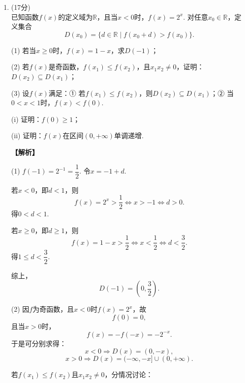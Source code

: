 \documentclass[12pt,a4paper]{article}
\begin{document}
\begin{enumerate}[leftmargin=*,label=\arabic*.,resume,itemsep=1.2ex]
		(ii) 仍设$u_P,u_Q$为上述方程两根，记
		\[
		S=u_P+u_Q=\frac6{3+4t^2}.
		\]
		向量
		\[
		\overrightarrow{QP}=(u_P-u_Q,t(u_P-u_Q)),
		\]
		\[
		\overrightarrow{QR}=(-P)-Q=(2-S,-tS).
		\]
		于是
		\[
		|\overrightarrow{QP}\times\overrightarrow{QR}|=2t(u_P-u_Q),
		\]
		\[
		\overrightarrow{QP}\cdot\overrightarrow{QR}
		=(u_P-u_Q)\left[2-S(1+t^2)\right].
		\]
		因此
		\[
		\tan\angle PQR
		=\frac{2t}{2-S(1+t^2)}.
		\]
		代入$S=\dfrac6{3+4t^2}$，化简得
		\[
		\tan\angle PQR
		=\frac{3+4t^2}{t}
		=4t+\frac3t.
		\]
		由均值不等式，
		\[
		4t+\frac3t\ge2\sqrt{12}=4\sqrt3,
		\]
		当且仅当$4t=\dfrac3t$，即$t=\dfrac{\sqrt3}{2}$时取等号.
		
		所以
		\[
		\boxed{\tan\angle PQR_{\min}=4\sqrt3}.
		\]
		
		\item (17分)\\
		已知函数$f(x)$的定义域为$\mathbb{R}$，且当$x<0$时，$f(x)=2^x$. 对任意$x_0\in\mathbb{R}$，定义集合
		\[
		D(x_0)=\{d\in\mathbb{R}\mid f(x_0+d)>f(x_0)\}.
		\]
		
		(1) 若当$x\ge0$时，$f(x)=1-x$，求$D(-1)$；
		
		(2) 若$f(x)$是奇函数，$f(x_1)\le f(x_2)$，且$x_1x_2\ne0$，证明：$D(x_2)\subseteq D(x_1)$；
		
		(3) 设$f(x)$满足：① 若$f(x_1)\le f(x_2)$，则$D(x_2)\subseteq D(x_1)$；② 当$0<x<1$时，$f(x)<f(0)$.
		
		\hspace*{2em}(i) 证明：$f(0)\ge1$；
		
		\hspace*{2em}(ii) 证明：$f(x)$在区间$(0,+\infty)$单调递增.
		
		\textbf{【解析】}
		
		(1) $f(-1)=2^{-1}=\dfrac12$. 令$x=-1+d$.
		
		若$x<0$，即$d<1$，则
		\[
		f(x)=2^x>\frac12\iff x>-1\iff d>0.
		\]
		得$0<d<1$.
		
		若$x\ge0$，即$d\ge1$，则
		\[
		f(x)=1-x>\frac12\iff x<\frac12\iff d<\frac32.
		\]
		得$1\le d<\dfrac32$.
		
		综上，
		\[
		\boxed{D(-1)=\left(0,\frac32\right)}.
		\]
		
		(2) 因$f$为奇函数，且$x<0$时$f(x)=2^x$，故
		\[
		f(0)=0,
		\]
		且当$x>0$时，
		\[
		f(x)=-f(-x)=-2^{-x}.
		\]
		于是可分别求得：
		\[
		x<0\Rightarrow D(x)=(0,-x),
		\]
		\[
		x>0\Rightarrow D(x)=(-\infty,-x]\cup(0,+\infty).
		\]
		
		若$f(x_1)\le f(x_2)$且$x_1x_2\ne0$，分情况讨论：
		

\end{enumerate}
\end{document}
